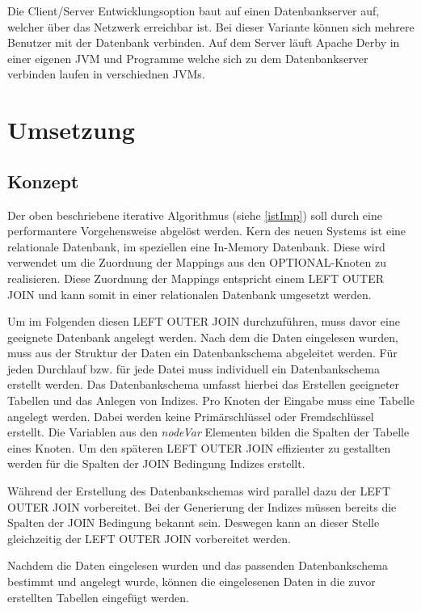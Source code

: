 \documentclass[draft,final]{vutinfth} %
\begin{document}
Die Client/Server Entwicklungsoption baut auf einen Datenbankserver auf, welcher über das Netzwerk erreichbar ist. Bei dieser Variante können sich mehrere Benutzer mit der Datenbank verbinden. Auf dem Server läuft Apache Derby in einer eigenen JVM und Programme welche sich zu dem Datenbankserver verbinden laufen in verschiednen JVMs.


 
\cite{ApaDoc}

\chapter{Umsetzung}
\section{Konzept}
Der oben beschriebene iterative Algorithmus (siehe \ref{istImp}) soll durch eine performantere Vorgehensweise abgelöst werden. Kern des neuen Systems ist eine relationale Datenbank, im speziellen eine In-Memory Datenbank. Diese wird verwendet um die Zuordnung der Mappings aus den OPTIONAL-Knoten zu realisieren. Diese Zuordnung der Mappings entspricht einem LEFT OUTER JOIN und kann somit in einer relationalen Datenbank umgesetzt werden.

Um im Folgenden diesen LEFT OUTER JOIN durchzuführen, muss davor eine geeignete Datenbank angelegt werden. Nach dem die Daten eingelesen wurden, muss aus der Struktur der Daten ein Datenbankschema abgeleitet werden. Für jeden Durchlauf bzw. für jede Datei muss individuell ein Datenbankschema erstellt werden. Das Datenbankschema umfasst hierbei das Erstellen geeigneter Tabellen und das Anlegen von Indizes. Pro Knoten der Eingabe muss eine Tabelle angelegt werden. Dabei werden keine Primärschlüssel oder Fremdschlüssel erstellt. Die Variablen aus den \textit{nodeVar} Elementen bilden die Spalten der Tabelle eines Knoten. Um den späteren LEFT OUTER JOIN effizienter zu gestallten werden für die Spalten der JOIN Bedingung Indizes erstellt.

Während der Erstellung des Datenbankschemas wird parallel dazu der LEFT OUTER JOIN vorbereitet. Bei der Generierung der Indizes müssen bereits die Spalten der JOIN Bedingung bekannt sein. Deswegen kann an dieser Stelle gleichzeitig der LEFT OUTER JOIN vorbereitet werden.

Nachdem die Daten eingelesen wurden und das passenden Datenbankschema bestimmt und angelegt wurde, können die eingelesenen Daten in die zuvor erstellten Tabellen eingefügt werden. 
\end{document}
